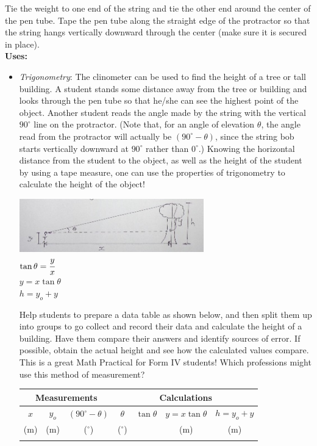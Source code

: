 Tie the weight to one end of the string and tie the other end around the center of the pen tube. Tape the pen tube along the straight edge of the protractor so that the string hangs vertically downward through the center (make sure it is secured in place).\\

\noindent\textbf{Uses:}
\begin{itemize}
\item \emph{Trigonometry}: The clinometer can be used to find the height of a tree or tall building. A student stands some distance away from the tree or building and looks through the pen tube so that he\slash she can see the highest point of the object. Another student reads the angle made by the string with the vertical $90^\circ$ line on the protractor. (Note that, for an angle of elevation $\theta$, the angle read from the protractor will actually be $(90^\circ - \theta)$, since the string bob starts vertically downward at $90^\circ$ rather than $0^\circ$.) Knowing the horizontal distance from the student to the object, as well as the height of the student by using a tape measure, one can use the properties of trigonometry to calculate the height of the object!

	\begin{center}
	\includegraphics[width=8cm]{./img/clin1.jpg}\\
	$\tan \theta = \cfrac{y}{x}$\\
	$y = x\tan \theta$\\
	$h = y_o + y$
	\end{center}

Help students to prepare a data table as shown below, and then split them up into groups to go collect and record their data and calculate the height of a building. Have them compare their answers and identify sources of error. If possible, obtain the actual height and see how the calculated values compare. This is a great Math Practical for Form IV students! Which professions might use this method of measurement?\\
\begin{center}
\begin{tabular}{|c|c|c||c|c|c|c|} \hline
\multicolumn{3}{|c||}{\textbf{Measurements}} & \multicolumn{4}{c|}{\textbf{Calculations}} \\ \hline
$x$ & $y_o$ & $(90^\circ - \theta)$ & $\theta$ & $\tan \theta$ & $y = x\tan \theta$ & $h = y_o + y$\\
(m) & (m) & ($^\circ$) & ($^\circ$) & & (m) & (m)\\ \hline
&&&&&& \\ \hline
\end{tabular}
\end{center}
\end{itemize}

